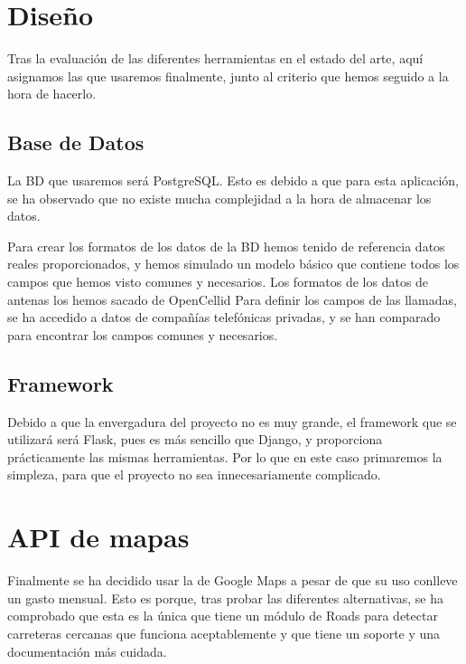 \section{Diseño\label{SEC:DISENO}}
  Tras la evaluación de las diferentes herramientas en el estado del arte, aquí asignamos las que usaremos finalmente, junto al criterio que hemos seguido a la hora de hacerlo.
  
  \subsection{Base de Datos}
    La BD que usaremos será PostgreSQL. Esto es debido a que para esta aplicación, se ha observado que no existe mucha complejidad a la hora de almacenar los datos.
    
    Para crear los formatos de los datos de la BD hemos tenido de referencia datos reales proporcionados, y hemos simulado un modelo básico que contiene todos los campos que hemos visto comunes y necesarios.
    Los formatos de los datos de antenas los hemos sacado de OpenCellid \cite{opencellid}
    Para definir los campos de las llamadas, se ha accedido a datos de compañías telefónicas privadas, y se han comparado para encontrar los campos comunes y necesarios.
  \subsection{Framework}
    Debido a que la envergadura del proyecto no es muy grande, el framework que se utilizará será Flask, pues es más sencillo que Django, y proporciona prácticamente las mismas herramientas. Por lo que en este caso primaremos la simpleza, para que el proyecto no sea innecesariamente complicado.

  \section{API de mapas}
    Finalmente se ha decidido usar la  de Google Maps\cite{gmaps} a pesar de que su uso conlleve un gasto mensual. Esto es porque, tras probar las diferentes alternativas, se ha comprobado que esta  es la única que tiene un módulo de Roads para detectar carreteras cercanas que funciona aceptablemente y que tiene un soporte y una documentación más cuidada.

